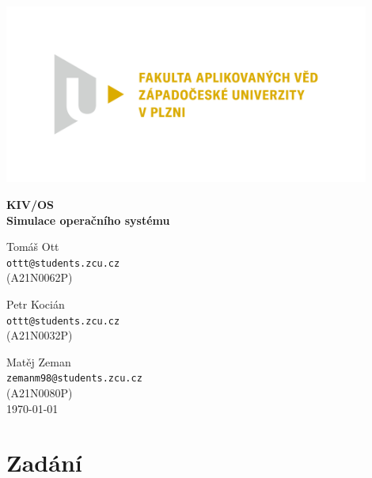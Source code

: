 \documentclass[ 12pt, a4paper]{article}
\begin{document}
\def\code#1{\texttt{#1}}

%
\centerline{\includegraphics[width=12cm]{logo.png}}
\vspace*{50px}

\begin{center}
	{\LARGE\bf\noindent KIV/OS \\ Simulace operačního systému}\\
	\vspace*{40px}  
	
	Tomáš Ott\\
	\texttt{ottt@students.zcu.cz}\\ 
	(A21N0062P)\\
	\vspace*{10px}  
	
	Petr Kocián\\
	\texttt{ottt@students.zcu.cz}\\ 
	(A21N0032P)\\
	\vspace*{10px}  
	
	Matěj Zeman\\
	\texttt{zemanm98@students.zcu.cz}\\ 
	(A21N0080P)\\
	
	\vspace*{\fill}  
	\hspace*{\fill} \today \\
\end{center}
\newpage
\tableofcontents
\newpage



\section{Zadání}
\end{document}
